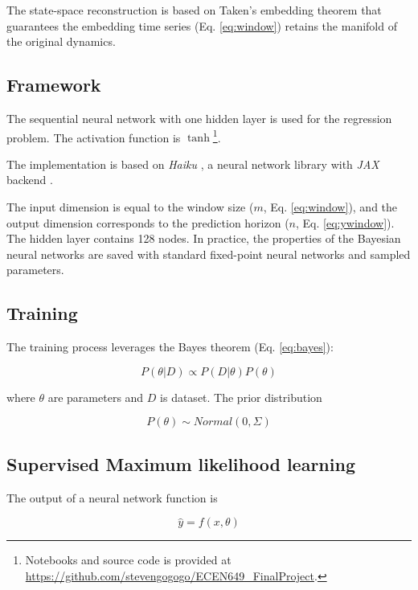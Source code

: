 \documentclass{article}
\begin{document}
The state-space reconstruction is based on Taken's embedding theorem that guarantees the embedding time series (Eq. \ref{eq:window}) retains the manifold of the original dynamics\cite{takens1981detecting}.

\subsection{Framework}

The sequential neural network with one hidden layer is used for the regression problem. The activation function is $\tanh$\footnote{Notebooks and source code is provided at \url{https://github.com/stevengogogo/ECEN649_FinalProject}.}.

The implementation is based on \textit{Haiku} \cite{haiku2020github}, a neural network library with \textit{JAX} backend \cite{jax2018github}.


The input dimension is equal to the window size ($m$, Eq. \ref{eq:window}), and the output dimension corresponds to the prediction horizon ($n$, Eq. \ref{eq:ywindow}). The hidden layer contains 128 nodes. In practice, the properties of the Bayesian neural networks are saved with standard fixed-point neural networks and sampled parameters.


\subsection{Training}

The training process leverages the Bayes theorem (Eq. \ref{eq:bayes}):

\begin{equation}
P(\theta | D) \propto P(D|\theta) P(\theta)
\label{eq:bayes}
\end{equation}

where $\theta$ are parameters and $D$ is dataset. The prior distribution 

\begin{equation}
P(\theta) \sim Normal(0, \Sigma)
\label{eq:weight-prior}
\end{equation}


\subsection{Supervised Maximum likelihood learning}

The output of a neural network function is 

\begin{equation}
    \hat{y} = f(x, \theta)
    \label{eq:net-output}
\end{equation}
\end{document}

